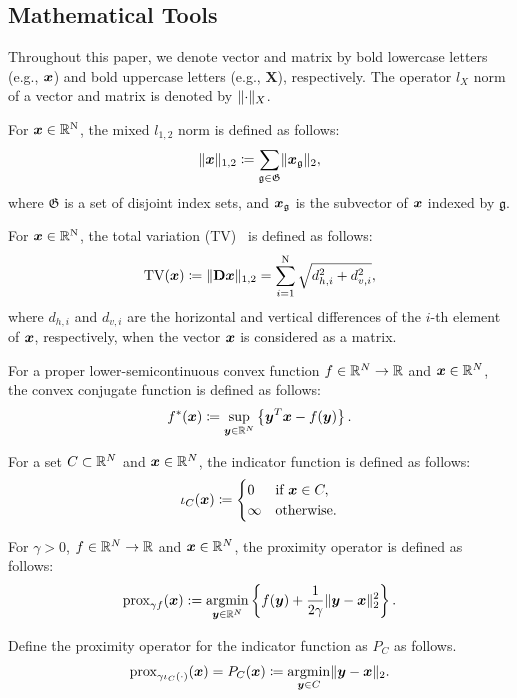 \subsection{Mathematical Tools}\label{subsec:mathematical-tools}

Throughout this paper, we denote vector and matrix by bold lowercase letters (e.g., $\vecx$) and bold uppercase letters (e.g., $\bm{X}$), respectively.
The operator $l_{X}$ norm of a vector and matrix is denoted by $\Norm{\cdot}__{X}$.

For $\vecx \in \realNumber^{\intN}$, the mixed $l_{1,2}$ norm is defined as follows:
\begin{equation} \label{eq:L12NormDefinitionEq} \LOneTwoNormDefinition, \end{equation}
where $\mathfrak{G}$ is a set of disjoint index sets, and $\vecx_{\mathfrak{g}}$ is the subvector of $\vecx$ indexed by $\mathfrak{g}$.

For $\vecx \in \realNumber^{\intN}$, the total variation (TV)~\cite{TV} is defined as follows:
\begin{equation} \label{eq:TVDefinitionEq} \TotalVariationDefinition, \end{equation}
where $d_{h,i}$ and $d_{v,i}$ are the horizontal and vertical differences of the $i$-th element of $\vecx$, respectively, when the vector $\vecx$ is considered as a matrix.

For a proper lower-semicontinuous convex function $f \in \realNumber^N \to \realNumber$ and $\vecx \in \realNumber^N$, the convex conjugate function is defined as follows:
\begin{equation} \label{eq:ConjugateFunctionDefinitionEq} \conjugateFunctionDefinition. \end{equation}

For a set $C \subset \realNumber^N$ and $\vecx \in \realNumber^N$, the indicator function is defined as follows:
\begin{equation} \label{eq:IndicatorFunctionDefinitionEq} \indicatorFunctionDefinition \end{equation}

For $\gamma > 0$, $f \in \realNumber^N \to \realNumber$ and $\vecx \in \realNumber^N$, the proximity operator is defined as follows:
\begin{equation} \label{eq:ProximityOperatorDefinitionEq} \proximityOperatorDefinition. \end{equation}

Define the proximity operator for the indicator function as $P_C$ as follows.
\begin{equation} \label{eq:ProximityOperatorDefinitionWithIndicatorFunctionEq}
\proximityOperator{ \gamma \indicatorFunction{C}{\cdot} }{\vecx} = P_C(\vecx) \coloneq \argmin{\vecy \in C} \LTwoNorm{\vecy - \vecx}.
\end{equation}

